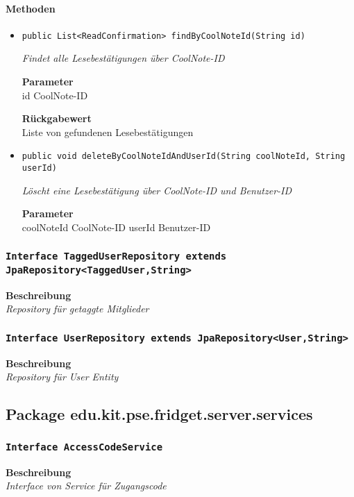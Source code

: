     \paragraph*{Methoden}
    \begin{itemize}
    	\item{\texttt{public List<ReadConfirmation> findByCoolNoteId(String id)}}
    	
    	\textit{Findet alle Lesebestätigungen über CoolNote-ID}
    	
    	\textbf{Parameter} \\
    	id CoolNote-ID
    	
    	\textbf{Rückgabewert} \\
    	Liste von gefundenen Lesebestätigungen        \item{\texttt{public void deleteByCoolNoteIdAndUserId(String coolNoteId, String userId)}}
    	
    	\textit{Löscht eine Lesebestätigung über CoolNote-ID und Benutzer-ID}
    	
    	\textbf{Parameter} \\
    	coolNoteId CoolNote-ID
    	userId Benutzer-ID
    	
    	
    \end{itemize}
    \subsubsection{\texttt{Interface TaggedUserRepository extends JpaRepository<TaggedUser,String>}}
    \textbf{Beschreibung} \\
    \textit{Repository für getaggte Mitglieder}
    \subsubsection{\texttt{Interface UserRepository extends JpaRepository<User,String>}}
    \textbf{Beschreibung} \\
    \textit{Repository für User Entity}
    \subsection{Package edu.kit.pse.fridget.server.services}
    \subsubsection{\texttt{Interface AccessCodeService}}
    \textbf{Beschreibung} \\
    \textit{Interface von Service für Zugangscode}
